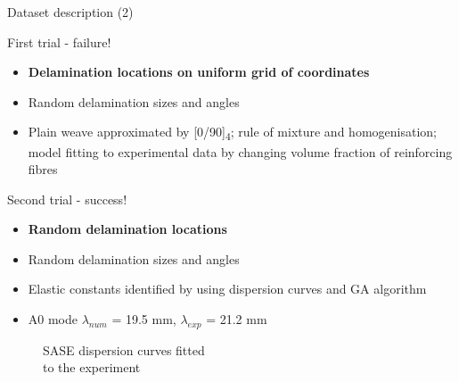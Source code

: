 \documentclass[10pt,aspectratio=169,dvipsnames]{beamer} %
\newcounter{angle}
\begin{document}
\begin{frame}{Dataset description (2)}
	\begin{minipage}[l]{0.59\textwidth}
		First trial - \alert{failure!}
		\begin{itemize}
			\item \textbf{Delamination locations on uniform grid of coordinates}
			\item Random delamination sizes and angles
			\item Plain weave approximated by [0/90]\textsubscript{4}; rule of mixture and homogenisation; model fitting to experimental data by changing volume fraction of reinforcing fibres 
		\end{itemize}
	Second trial - \alert{success!}
	\begin{itemize}
		\item \textbf{Random delamination locations}
		\item Random delamination sizes and angles
		\item Elastic constants identified by using dispersion curves and GA algorithm
		\item A0 mode $\lambda_{num}$ = 19.5 mm, $\lambda_{exp}$ = 21.2 mm
	\end{itemize}
	\end{minipage}
	\begin{minipage}[c]{0.39\textwidth}
		\begin{figure}
			\centering
			\caption{\hspace{10mm}SASE dispersion curves fitted \\ \hspace{10mm}to the experiment}
		\end{figure}
	\end{minipage}
\end{frame}
\end{document}
